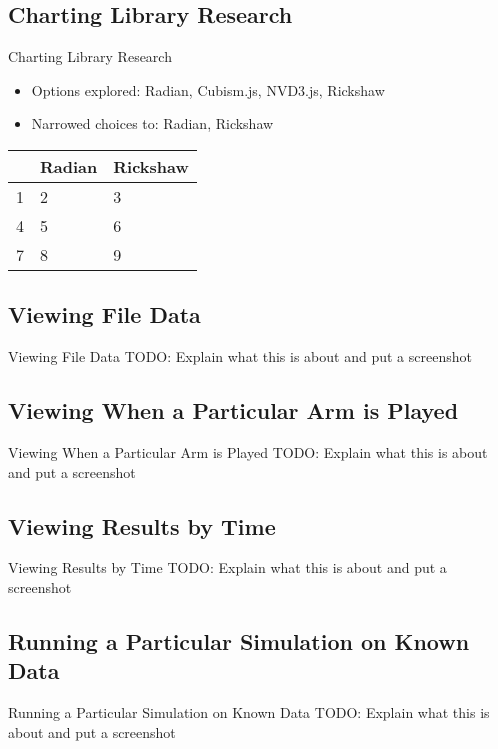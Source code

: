 \documentclass{beamer}
\begin{document}
\subsection{Charting Library Research}
\begin{frame}{Charting Library Research}
	\begin{itemize}
		\item Options explored: Radian, Cubism.js, NVD3.js, Rickshaw
		\item Narrowed choices to: Radian, Rickshaw
	\end{itemize}
\begin{tabular}{| l | l | l |}
    \hline
     & Radian & Rickshaw \\ \hline
  1 & 2 & 3  \\
  4 & 5 & 6  \\
  7 & 8 & 9  \\
\end{tabular}
\end{frame}

\subsection{Viewing File Data}
\begin{frame}{Viewing File Data}
TODO: Explain what this is about and put a screenshot
\end{frame}

\subsection{Viewing When a Particular Arm is Played}
\begin{frame}{Viewing When a Particular Arm is Played}
TODO: Explain what this is about and put a screenshot
\end{frame}

\subsection{Viewing Results by Time}
\begin{frame}{Viewing Results by Time}
TODO: Explain what this is about and put a screenshot
\end{frame}

\subsection{Running a Particular Simulation on Known Data}
\begin{frame}{Running a Particular Simulation on Known Data}
TODO: Explain what this is about and put a screenshot
\end{frame}
\end{document}
